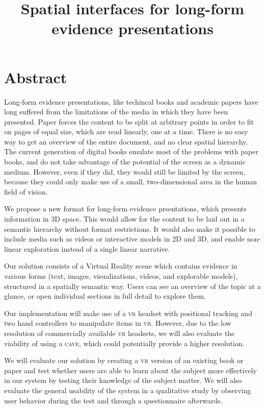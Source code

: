 



\title{Spatial interfaces for long-form evidence presentations}\maketitle

\section{Abstract}
Long-form evidence presentations, like techincal books and academic papers have long suffered from the limitations of the media in which they have been presented. Paper forces the content to be split at arbitrary points in order to fit on pages of equal size, which are read linearly, one at a time. There is no easy way to get an overview of the entire document, and no clear spatial hierarchy. The current generation of digital books emulate most of the problems with paper books, and do not take advantage of the potential of the screen as a dynamic medium. However, even if they did, they would still be limited by the screen, because they could only make use of a small, two-dimensional area in the human field of vision.

We propose a new format for long-form evidence prsentations, which presents information in 3D space. This would allow for the content to be laid out in a semantic hierarchy without format restrictions. It would also make it possible to include media such as videos or interactive models in 2D and 3D, and enable non-linear exploration instead of a single linear narrative.

Our solution consists of a Virtual Reality scene which contains evidence in various forms (text, images, visualizations, videos, and explorable models), structured in a spatially semantic way. Users can see an overview of the topic at a glance, or open individual sections in full detail to explore them.

Our implementation will make use of a \textsc{vr} headset with positional tracking and two hand controllers to manipulate items in \textsc{vr}. However, due to the low resolution of commercially available \textsc{vr} headsets, we will also evaluate the viability of using a \textsc{cave}, which could potentially provide a higher resolution.

We will evaluate our solution by creating a \textsc{vr} version of an existing book or paper and test whether users are able to learn about the subject more effectively in our system by testing their knowledge of the subject matter. We will also evaluate the general usability of the system in a qualitative study by observing user behavior during the test and through a questionnaire afterwards.


